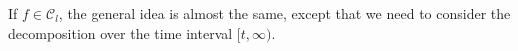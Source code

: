 \documentclass[12pt,a4paper]{amsart}
\theoremstyle{plain}
\theoremstyle{definition}
\numberwithin{equation}{section}
\begin{document}
\)
\begin{comment}
In the explanation above, we have used the facts that $(\zeta_k)_{k\in \mathbb N}$, $\zeta$ are all well defined, and
\begin{align}
  \label{eq: equatlity for mf for small rate}
  m[f]
  = \sum_{k=0}^\infty \langle Z_1 T_k \tilde f,\varphi \rangle,\quad f\in\mathcal C_s.
\end{align}
These facts will be made clear in Lemma \ref{lem:m} and formula \eqref{eq:PM:CLTS:2}.

If $f\in \mathcal C_c$, i.e., $\alpha \tilde \beta = \kappa_f b$,
then
\[
  m[f]
  = \lim_{t\rightarrow \infty}\frac{1}{t}\sum_{k=0}^{\lfloor t \rfloor}\langle Z_1 T_k \tilde f,\varphi \rangle, \quad f\in \mathcal C_c.
\]
In this case, we roughly have that
\[
 	\frac{\langle f,X_t\rangle}{(t\|X_t\|)^{\frac{1}{1+\beta}}}
  \overset{d}{\approx} \frac{1}{t^{\frac{1}{1+\beta}}} \sum_{k=0}^{\lfloor t\rfloor} \zeta_k
  \xrightarrow[t\to \infty]{d} \zeta,
\]
where $\zeta$ is a $(1+\beta)$-stable random variable with characteristic function $\theta\mapsto \exp( m[\theta f])$.
\end{comment}
If $f\in \mathcal C_l$, the general idea is almost the same, except that we need to consider the decomposition over the time interval $[t,\infty)$.
\begin{comment}
Taking $f = \phi_p$ with $\alpha \tilde \beta > |p|b$ as an example, we do the following decomposition:
\[
  H^p_t-H^p_\infty
  =\sum^{\infty}_{n=1}(H^p_{t+n-1}-H^p_{t+n}).
\]
The fluctuation behaviors of each of the terms $H_{t+n-1}^p - H_{t+n}^p$ and their asymptotic independence will also be established in Theorem \ref{lem:PR:LC} and Corollary \ref{cor:MI} below.
These lemmas will eventually lead us to the fluctuation result in the large branching rate regime.
\end{comment}

\begin{comment}
For a general $f$, we have a unique decomposition: $f=f_l+f_c+f_s$ with $f_l\in\mathcal C_l$, $f_c\in\mathcal C_c$ and $f_s\in\mathcal C_c$.
Note that there may be no $p$ such that $|p|=\frac{\alpha \tilde\beta}{b}$. In this case $f_c=0$.
Our main results above give central limit type results for $\langle f_l, X_t\rangle$, $\langle f_c, X_t\rangle$ and $\langle f_s, X_t\rangle$, respectively.
We conjecture that the limits of these three terms, normalized properly, are independent, because intuitively these limits come from small time intervals, intermediate time intervals and large time intervals, respectively.
If this is valid, we can get a central limit type result for $\langle f, X_t\rangle$ for general $f\in\mathcal{P}$.
This independence was proved under the second moment condition, see \cite{RenSongZhang2015Central}.
We leave the question of independence for stable branching mechanism to a future project.
\end{comment}
\end{document}
